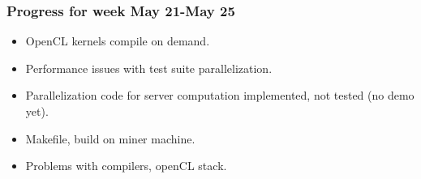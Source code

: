 \begin{frame}
\frametitle{Progress for week May 21-May 25}
\begin{itemize}
\item OpenCL kernels compile on demand.
\item Performance issues with test suite parallelization.
\item Parallelization code for server computation implemented, not tested (no demo yet).
\item Makefile, build on miner machine.
\item Problems with compilers, openCL stack.
\end{itemize}
\end{frame}